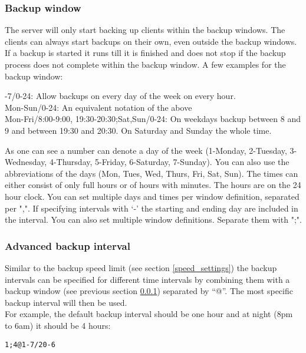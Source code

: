 \documentclass[a4paper,10pt]{article}
\begin{document}
\subsubsection{Backup window}
\label{subsub_backup_window}

The server will only start backing up clients within the backup windows. The clients can always start backups on their own, even outside the backup windows. If a backup is started it runs till it is finished and does not stop if the backup process does not complete within the backup window. A few examples for the backup window:
\par\null\par
{}-7/0-24: Allow backups on every day of the week on every hour.\\
Mon-Sun/0-24: An equivalent notation of the above\\
Mon-Fri/8:00-9:00, 19:30-20:30;Sat,Sun/0-24: On weekdays backup between 8 and 9 and between 19:30 and 20:30. On Saturday and Sunday the whole time.
\par\null\par
As one can see a number can denote a day of the week (1-Monday, 2-Tuesday, 3-Wednesday, 4-Thursday, 5-Friday, 6-Saturday, 7-Sunday). You can also use the abbreviations of the days (Mon, Tues, Wed, Thurs, Fri, Sat, Sun). The times can either consist of only full hours or of hours with minutes. The hours are on the 24 hour clock. You can set multiple days and times per window definition, separated per ",". If specifying intervals with `-' the starting and ending day are included in the interval. You can also set multiple window definitions. Separate them with ";".

\subsubsection{Advanced backup interval}
\label{advanced_backup_interval}

Similar to the backup speed limit (see section \ref{speed_settings}) the backup intervals can be specified for different time intervals by combining them with a backup window (see previous section \ref{subsub_backup_window}) separated by ``@''. The most specific backup interval will then be used.\\

\noindent For example, the default backup interval should be one hour and at night (8pm to 6am) it should be 4 hours:

\begin{verbatim}
1;4@1-7/20-6
\end{verbatim}
\end{document}
